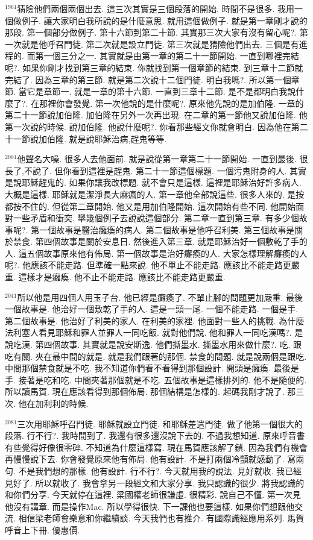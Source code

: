 \documentclass{book}
\begin{document}
$^{1961}$猜險他們兩個兩個出去.
這三次其實是三個段落的開始.
時間不是很多.
我用一個做例子.
讓大家明白我所說的是什麼意思.
就用這個做例子.
就是第一章剛才說的那段.
第一個部分做例子.
第十六節到第二十節.
其實那三次大家有沒有留心呢?.
第一次就是他呼召門徒.
第二次就是設立門徒.
第三次就是猜險他們出去.
三個是有進程的.
而第一個三分之一.
其實就是由第一章的第二十一節開始.
一直到哪裡完結呢?.
如果你剛才找到第三章的結束.
你就找到第一個章節的結束.
到三章十二節就完結了.
因為三章的第三節.
就是第二次說十二個門徒.
明白我嗎?.
所以第一個章節.
當它是章節一.
就是一章的第十六節.
一直到三章十二節.
是不是都明白我說什麼了?.
在那裡你會發覺.
第一次他說的是什麼呢?.
原來他先說的是加伯隆.
一章的第二十一節說加伯隆.
加伯隆在另外一次再出現.
在二章的第一節他又說加伯隆.
他第一次說的時候.
說加伯隆.
他說什麼呢?.
你看那些經文你就會明白.
因為他在第二十一節說加伯隆.
就是說耶穌治病,趕鬼等等.

$^{2001}$他聲名大噪.
很多人去他面前.
就是說從第一章第二十一節開始.
一直到最後.
很長了,不說了.
但你看到這裡是趕鬼.
第二十一節這個標題.
一個污鬼附身的人.
其實是說耶穌趕鬼的.
如果你讓我改標題.
就不會只是這樣.
這裡是耶穌治好許多病人.
大概是這樣.
耶穌就是潔淨長大麻瘋的人.
第一章他全部說這些.
很多人來的.
是按都按不住的.
但從第二章開始.
他又是用加伯隆開始.
這次開始有些不同.
他開始面對一些矛盾和衝突.
舉幾個例子去說說這個部分.
第二章一直到第三章.
有多少個故事呢?.
第一個故事是醫治癱瘓的病人.
第二個故事是他呼召利美.
第三個故事是關於禁食.
第四個故事是關於安息日.
然後進入第三章.
就是耶穌治好一個敷乾了手的人.
這五個故事原來他有佈局.
第一個故事是治好癱瘓的人.
大家怎樣理解癱瘓的人呢?.
他應該不能走路.
但準確一點來說.
他不單止不能走路.
應該比不能走路更嚴重.
這樣才是癱瘓.
他不止不能走路.
應該比不能走路更嚴重.

$^{2041}$所以他是用四個人用玉子台.
他已經是癱瘓了.
不單止腳的問題更加嚴重.
最後一個故事是.
他治好一個敷乾了手的人.
這是一頭一尾.
一個不能走路.
一個是手.
第二個故事是.
他治好了利美的家人.
在利美的家裡.
他面對一些人的挑戰.
為什麼法利塞人看見耶穌和罪人並罪人一同吃飯.
就對他們說.
他和罪人一同吃漢嗎?.
是說吃漢.
第四個故事.
其實就是說安斯逸.
他們撕墨水.
撕墨水用來做什麼?.
吃.
跟吃有關.
夾在最中間的就是.
就是我們跟著的那個.
禁食的問題.
就是說兩個是跟吃.
中間那個禁食就是不吃.
我不知道你們看不看得到那個設計.
開頭是癱瘓.
最後是手.
接著是吃和吃.
中間夾著那個就是不吃.
五個故事是這樣排列的.
他不是隨便的.
所以讀馬賀.
現在應該看得到那個佈局.
那個結構是怎樣的.
起碼我剛才說了.
那三次.
他在加利利的時候.

$^{2081}$三次用耶穌呼召門徒.
耶穌就設立門徒.
和耶穌差遣門徒.
做了他第一個很大的段落.
行不行?.
我時間到了.
我還有很多還沒說下去的.
不過我想知道.
原來呼音書有些覺得好像很零碎.
不知道為什麼這樣寫.
現在馬賀應該解了鎖.
因為我們有機會再慢慢說下去.
你會發覺原來他有佈局.
他有設計.
不是打兩個冷顫就感動了.
寫兩句.
不是我們想的那樣.
他有設計.
行不行?.
今天就用我的說法.
見好就收.
我已經見好了.
所以就收了.
我會拿另一段經文和大家分享.
我只認識的很少.
將我認識的和你們分享.
今天就停在這裡.
梁國權老師很謙虛.
很精彩.
說自己不懂.
第一次見他沒有講章.
而是操作Mac.
所以學得很快.
下一課他也要這樣.
如果你們想跟他交流.
相信梁老師會樂意和你繼續談.
今天我們也有推介.
有國際識經應用系列.
馬賀呼音上下冊.
優惠價.
\end{document}
